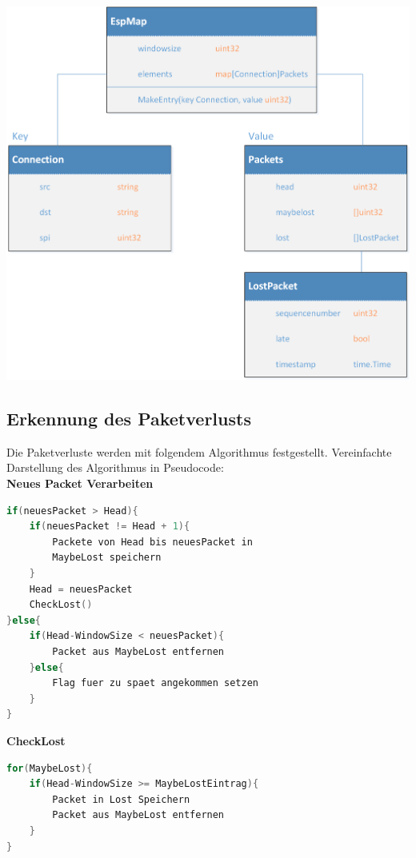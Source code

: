 \includegraphics[width=1\textwidth]{start/img/Datenstruktur.png}

\subsection{Erkennung des Paketverlusts}
Die Paketverluste werden mit folgendem Algorithmus festgestellt.
Vereinfachte Darstellung des Algorithmus in Pseudocode:
\\
\textbf{Neues Packet Verarbeiten}
\begin{lstlisting}[language=go]
if(neuesPacket > Head){
	if(neuesPacket != Head + 1){
		Packete von Head bis neuesPacket in 
		MaybeLost speichern
	}
	Head = neuesPacket
	CheckLost()
}else{
	if(Head-WindowSize < neuesPacket){
		Packet aus MaybeLost entfernen
	}else{
		Flag fuer zu spaet angekommen setzen	
	}
}
\end{lstlisting}

\textbf{CheckLost}
\begin{lstlisting}[language=go]
for(MaybeLost){
	if(Head-WindowSize >= MaybeLostEintrag){
		Packet in Lost Speichern
		Packet aus MaybeLost entfernen
	}
}
\end{lstlisting}
